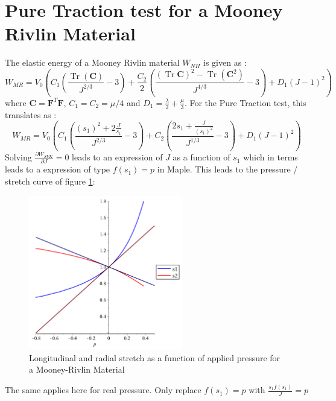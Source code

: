 \documentclass[a4paper,11pt]{article}
\newcommand{\rcgd}{{\mathbf C}}
\newcommand{\defGrad}{{\mathbf F}}
\DeclareMathOperator{\Trace}{Tr}
\begin{document}
\section{Pure Traction test for a Mooney Rivlin Material}

The elastic energy of a Mooney Rivlin  material $W_{NH}$ is given as :
\[
W_{MR} = V_0 \left (C_1 (\frac{\Trace (\rcgd)}{J^{2/3}}-3) + \frac{C_2}{2} (\frac{(\Trace \rcgd)^2 -\Trace (\rcgd^2) }{J^{4/3}}-3) + D_1 (J-1)^2 \right )
\]
where $\rcgd=\defGrad^T \defGrad$, $C_1=C_2=\mu/4$ and $D_1=\frac{\lambda}{2}+\frac{\mu}{3}$. For the Pure Traction test, this translates as :
\[
W_{MR} = V_0 \left (C_1 \left (\frac{(s_1)^2 +2\frac{J}{s_1}}{J^{2/3}}-3\right ) + C_2 \left ( \frac{2 s_1  + \frac{J}{(s_1)^2}}{J^{1/3}}-3\right )+ D_1 \left (J-1\right)^2 \right)
\]
Solving $\frac{\partial W_{SVK}}{\partial J}=0$ leads to an expression of $J$ as a function of $s_1$ which in terms leads to a expression of type $f(s_1)=p$ in Maple. This leads to the   pressure / stretch curve of figure \ref{fig:PureTractionMR}:
\begin{figure}[!htbp]
	\centering
    \includegraphics[width=0.60\textwidth]{CurveMR}
	\caption{Longitudinal and radial stretch as a function of applied pressure for a Mooney-Rivlin  Material}
	\label{fig:PureTractionMR}
\end{figure}

The same applies here for real pressure. Only replace $f(s_1)=p$ with $\frac{s_1 f(s_1)}{J}=p$
\end{document}
